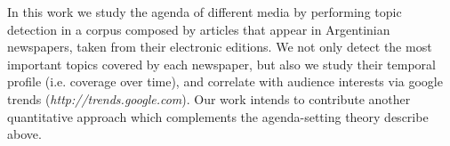 \par In this work we study the agenda of different media by performing topic detection in a corpus composed by articles that appear in Argentinian newspapers, taken from their electronic editions.
We not only detect the most important topics covered by each newspaper, but also we study their temporal profile (i.e. coverage over time), and correlate with audience interests via google trends (\textit{http://trends.google.com}). 
Our work intends to contribute another quantitative approach which complements the agenda-setting theory describe above. 
